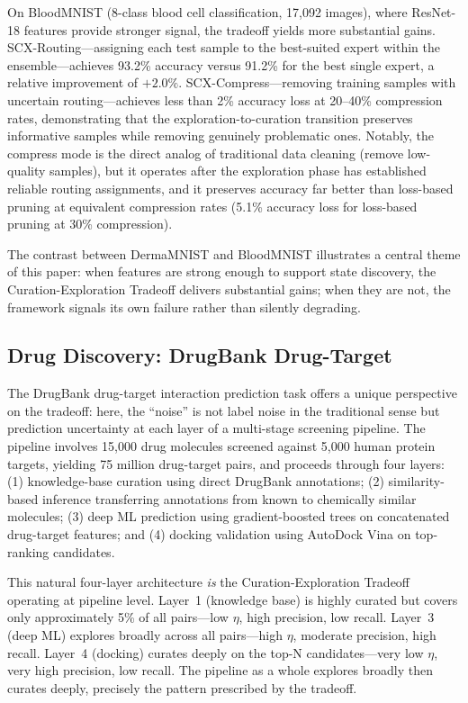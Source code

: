 \documentclass{article}
\begin{document}
On BloodMNIST (8-class blood cell classification, 17,092 images), where ResNet-18 features provide stronger signal, the tradeoff yields more substantial gains. SCX-Routing---assigning each test sample to the best-suited expert within the ensemble---achieves 93.2\% accuracy versus 91.2\% for the best single expert, a relative improvement of $+2.0\%$. SCX-Compress---removing training samples with uncertain routing---achieves less than 2\% accuracy loss at 20--40\% compression rates, demonstrating that the exploration-to-curation transition preserves informative samples while removing genuinely problematic ones. Notably, the compress mode is the direct analog of traditional data cleaning (remove low-quality samples), but it operates after the exploration phase has established reliable routing assignments, and it preserves accuracy far better than loss-based pruning at equivalent compression rates (5.1\% accuracy loss for loss-based pruning at 30\% compression).

The contrast between DermaMNIST and BloodMNIST illustrates a central theme of this paper: when features are strong enough to support state discovery, the Curation-Exploration Tradeoff delivers substantial gains; when they are not, the framework signals its own failure rather than silently degrading.

\subsection{Drug Discovery: DrugBank Drug-Target}
\label{sec:drugbank}

The DrugBank drug-target interaction prediction task offers a unique perspective on the tradeoff: here, the ``noise'' is not label noise in the traditional sense but prediction uncertainty at each layer of a multi-stage screening pipeline. The pipeline involves 15,000 drug molecules screened against 5,000 human protein targets, yielding 75 million drug-target pairs, and proceeds through four layers: (1) knowledge-base curation using direct DrugBank annotations; (2) similarity-based inference transferring annotations from known to chemically similar molecules; (3) deep ML prediction using gradient-boosted trees on concatenated drug-target features; and (4) docking validation using AutoDock Vina on top-ranking candidates.

This natural four-layer architecture \emph{is} the Curation-Exploration Tradeoff operating at pipeline level. Layer~1 (knowledge base) is highly curated but covers only approximately 5\% of all pairs---low $\eta$, high precision, low recall. Layer~3 (deep ML) explores broadly across all pairs---high $\eta$, moderate precision, high recall. Layer~4 (docking) curates deeply on the top-N candidates---very low $\eta$, very high precision, low recall. The pipeline as a whole explores broadly then curates deeply, precisely the pattern prescribed by the tradeoff.
\end{document}
